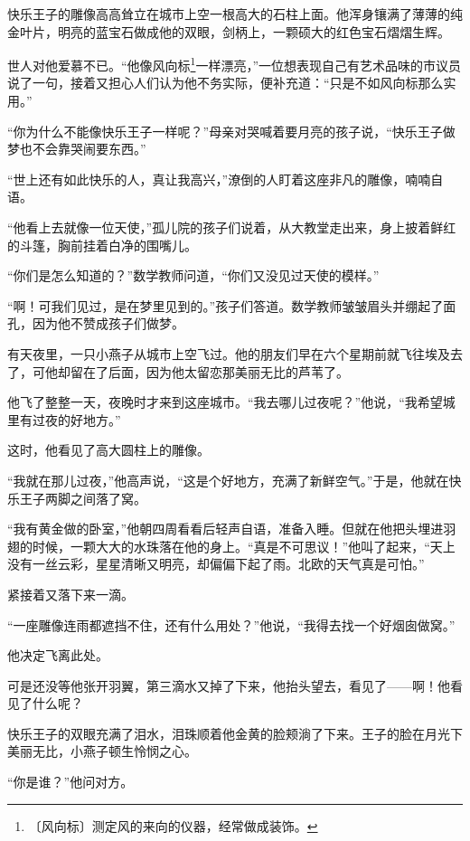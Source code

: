 \documentclass[12pt,UTF-8,openany]{ctexbook}
\begin{document}
\begin{normalsize}
    
    快乐王子的雕像高高耸立在城市上空一根高大的石柱上面。他浑身镶满了薄薄的纯金叶片，明亮的蓝宝石做成他的双眼，剑柄上，一颗硕大的红色宝石熠熠生辉。
    
    世人对他爱慕不已。“他像风向标\footnote{〔风向标〕测定风的来向的仪器，经常做成装饰。}一样漂亮，”一位想表现自己有艺术品味的市议员说了一句，接着又担心人们认为他不务实际，便补充道：“只是不如风向标那么实用。”
    
    “你为什么不能像快乐王子一样呢？”母亲对哭喊着要月亮的孩子说，“快乐王子做梦也不会靠哭闹要东西。”
    
    “世上还有如此快乐的人，真让我高兴，”潦倒的人盯着这座非凡的雕像，喃喃自语。
    
    “他看上去就像一位天使，”孤儿院的孩子们说着，从大教堂走出来，身上披着鲜红的斗篷，胸前挂着白净的围嘴儿。
    
    “你们是怎么知道的？”数学教师问道，“你们又没见过天使的模样。”
    
    “啊！可我们见过，是在梦里见到的。”孩子们答道。数学教师皱皱眉头并绷起了面孔，因为他不赞成孩子们做梦。
    
    有天夜里，一只小燕子从城市上空飞过。他的朋友们早在六个星期前就飞往埃及去了，可他却留在了后面，因为他太留恋那美丽无比的芦苇了。
    
    他飞了整整一天，夜晚时才来到这座城市。“我去哪儿过夜呢？”他说，“我希望城里有过夜的好地方。”
    
    这时，他看见了高大圆柱上的雕像。
    
    “我就在那儿过夜，”他高声说，“这是个好地方，充满了新鲜空气。”于是，他就在快乐王子两脚之间落了窝。
    
    “我有黄金做的卧室，”他朝四周看看后轻声自语，准备入睡。但就在他把头埋进羽翅的时候，一颗大大的水珠落在他的身上。“真是不可思议！”他叫了起来，“天上没有一丝云彩，星星清晰又明亮，却偏偏下起了雨。北欧的天气真是可怕。”
    
    紧接着又落下来一滴。
    
    “一座雕像连雨都遮挡不住，还有什么用处？”他说，“我得去找一个好烟囱做窝。”
    
    他决定飞离此处。
    
    可是还没等他张开羽翼，第三滴水又掉了下来，他抬头望去，看见了——啊！他看见了什么呢？
    
    快乐王子的双眼充满了泪水，泪珠顺着他金黄的脸颊淌了下来。王子的脸在月光下美丽无比，小燕子顿生怜悯之心。
    
    “你是谁？”他问对方。
    

\end{normalsize}
\end{document}
